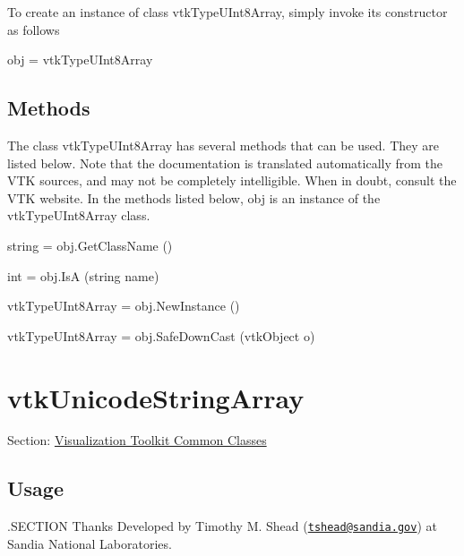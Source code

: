 To create an instance of class vtk\-Type\-U\-Int8\-Array, simply invoke its constructor as follows \begin{DoxyVerb}  obj = vtkTypeUInt8Array
\end{DoxyVerb}
 \hypertarget{vtkwidgets_vtkxyplotwidget_Methods}{}\subsection{Methods}\label{vtkwidgets_vtkxyplotwidget_Methods}
The class vtk\-Type\-U\-Int8\-Array has several methods that can be used. They are listed below. Note that the documentation is translated automatically from the V\-T\-K sources, and may not be completely intelligible. When in doubt, consult the V\-T\-K website. In the methods listed below, {\ttfamily obj} is an instance of the vtk\-Type\-U\-Int8\-Array class. 
\begin{DoxyItemize}
\item {\ttfamily string = obj.\-Get\-Class\-Name ()}  
\item {\ttfamily int = obj.\-Is\-A (string name)}  
\item {\ttfamily vtk\-Type\-U\-Int8\-Array = obj.\-New\-Instance ()}  
\item {\ttfamily vtk\-Type\-U\-Int8\-Array = obj.\-Safe\-Down\-Cast (vtk\-Object o)}  
\end{DoxyItemize}\hypertarget{vtkcommon_vtkunicodestringarray}{}\section{vtk\-Unicode\-String\-Array}\label{vtkcommon_vtkunicodestringarray}
Section\-: \hyperlink{sec_vtkcommon}{Visualization Toolkit Common Classes} \hypertarget{vtkwidgets_vtkxyplotwidget_Usage}{}\subsection{Usage}\label{vtkwidgets_vtkxyplotwidget_Usage}
.S\-E\-C\-T\-I\-O\-N Thanks Developed by Timothy M. Shead (\href{mailto:tshead@sandia.gov}{\tt tshead@sandia.\-gov}) at Sandia National Laboratories.

